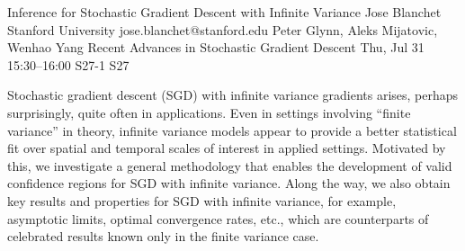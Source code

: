 \begin{talk}
  {Inference for Stochastic Gradient Descent with Infinite Variance}%
  {Jose Blanchet}%
  {Stanford University}%
  {jose.blanchet@stanford.edu}%
  {Peter Glynn, Aleks Mijatovic, Wenhao Yang}%
  {Recent Advances in Stochastic Gradient Descent}%
  {Thu, Jul 31 15:30--16:00}%
  {S27-1}%
  {S27}%
    
                
Stochastic gradient descent (SGD) with infinite variance gradients arises, perhaps surprisingly, quite often in applications. Even in settings involving “finite variance” in theory, infinite variance models appear to provide a better statistical fit over spatial and temporal scales of interest in applied settings. Motivated by this, we investigate a general methodology that enables the development of valid confidence regions for SGD with infinite variance. Along the way, we also obtain key results and properties for SGD with infinite variance, for example, asymptotic limits, optimal convergence rates, etc., which are counterparts of celebrated results known only in the finite variance case.


\medskip


\end{talk}

